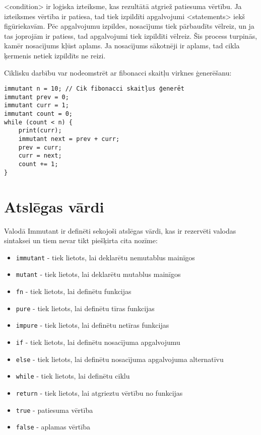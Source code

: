 \documentclass[12pt,a4paper]{report}
\begin{document}
<condition> ir loģiska izteiksme, kas rezultātā atgriež patiesuma vērtību. Ja izteiksmes vērtība ir patiesa, tad tiek izpildīti apgalvojumi <statements> iekš figūriekavām. Pēc apgalvojumu izpildes, nosacījums tiek pārbaudīts vēlreiz, un ja tas joprojām ir patiess, tad apgalvojumi tiek izpildīti vēlreiz. Šis process turpinās, kamēr nosacījums kļūst aplams. Ja nosacījums sākotnēji ir aplams, tad cikla ķermenis netiek izpildīts ne reizi.

Ciklisku darbību var nodeomstrēt ar fibonacci skaitļu virknes ģenerēšanu:
\begin{verbatim}
immutant n = 10; // Cik fibonacci skaitļus ģenerēt
immutant prev = 0;
immutant curr = 1;
immutant count = 0; 
while (count < n) {
    print(curr);
    immutant next = prev + curr;
    prev = curr;
    curr = next;
    count += 1;
}
\end{verbatim}

\section{Atslēgas vārdi}

Valodā Immutant ir definēti sekojoši atslēgas vārdi, kas ir rezervēti valodas sintaksei un tiem nevar tikt piešķirta cita nozīme:
\begin{itemize}
  \item \texttt{immutant} - tiek lietots, lai deklarētu nemutablus mainīgos
  \item \texttt{mutant} - tiek lietots, lai deklarētu mutablus mainīgos
  \item \texttt{fn} - tiek lietots, lai definētu funkcijas
  \item \texttt{pure} - tiek lietots, lai definētu tīras funkcijas
  \item \texttt{impure} - tiek lietots, lai definētu netīras funkcijas
  \item \texttt{if} - tiek lietots, lai definētu nosacījuma apgalvojumu
  \item \texttt{else} - tiek lietots, lai definētu nosacījuma apgalvojuma alternatīvu
  \item \texttt{while} - tiek lietots, lai definētu ciklu
  \item \texttt{return} - tiek lietots, lai atgrieztu vērtību no funkcijas
  \item \texttt{true} - patiesuma vērtība
  \item \texttt{false} - aplamas vērtība
\end{itemize}
\end{document}
